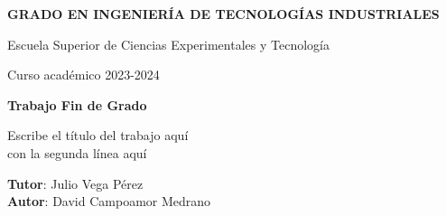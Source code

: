 \thispagestyle{empty}
\vspace{2cm}

\begin{figure}[htb]
  \centerline{}
\end{figure}

\begin{center}
  {\Large {\bf GRADO EN INGENIERÍA DE TECNOLOGÍAS INDUSTRIALES}}
  \vspace{5mm}
 
  {\large {Escuela Superior de Ciencias Experimentales y Tecnología}}
  \vspace{5mm}

  {\large {Curso académico 2023-2024}}

  \vspace{1cm}

  {\large {\bf Trabajo Fin de Grado}}

  \vspace{2cm}

  {\Large {Escribe el título del trabajo aquí\\
               con la segunda línea aquí\\[1cm] }}

  \vspace{5cm}
  {\bf Tutor}: Julio Vega Pérez \\
  {\bf Autor}: David Campoamor Medrano
\end{center}

\clearpage
\thispagestyle{empty}
